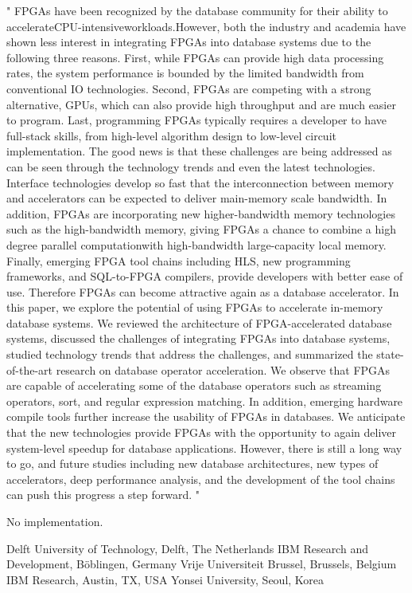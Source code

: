 "
FPGAs have been recognized by the database community
for their ability to accelerateCPU-intensiveworkloads.However,
both the industry and academia have shown less interest
in integrating FPGAs into database systems due to the following
three reasons. First, while FPGAs can provide high data
processing rates, the system performance is bounded by the
limited bandwidth from conventional IO technologies. Second,
FPGAs are competing with a strong alternative, GPUs,
which can also provide high throughput and are much easier
to program. Last, programming FPGAs typically requires a
developer to have full-stack skills, from high-level algorithm
design to low-level circuit implementation.
The good news is that these challenges are being addressed
as can be seen through the technology trends and even the
latest technologies. Interface technologies develop so fast
that the interconnection between memory and accelerators
can be expected to deliver main-memory scale bandwidth.
In addition, FPGAs are incorporating new higher-bandwidth
memory technologies such as the high-bandwidth memory,
giving FPGAs a chance to combine a high degree parallel
computationwith high-bandwidth large-capacity local memory.
Finally, emerging FPGA tool chains including HLS,
new programming frameworks, and SQL-to-FPGA compilers,
provide developers with better ease of use. Therefore
FPGAs can become attractive again as a database accelerator.
In this paper, we explore the potential of using FPGAs
to accelerate in-memory database systems. We reviewed
the architecture of FPGA-accelerated database systems, discussed
the challenges of integrating FPGAs into database
systems, studied technology trends that address the challenges,
and summarized the state-of-the-art research on
database operator acceleration. We observe that FPGAs are
capable of accelerating some of the database operators such
as streaming operators, sort, and regular expression matching.
In addition, emerging hardware compile tools further
increase the usability of FPGAs in databases. We anticipate
that the new technologies provide FPGAs with the opportunity
to again deliver system-level speedup for database
applications. However, there is still a long way to go, and
future studies including new database architectures, new
types of accelerators, deep performance analysis, and the
development of the tool chains can push this progress a step
forward.
"

No implementation.

Delft University of Technology, Delft, The Netherlands
IBM Research and Development, Böblingen, Germany
Vrije Universiteit Brussel, Brussels, Belgium
IBM Research, Austin, TX, USA
Yonsei University, Seoul, Korea